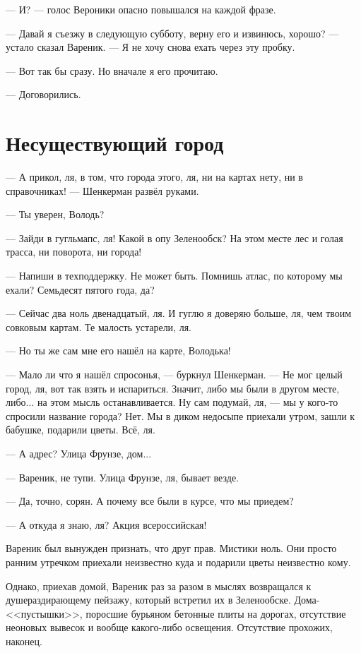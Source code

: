 \documentclass[a4paper,10pt,fleqn]{book}\usepackage{polyglossia}\setdefaultlanguage{english}\setotherlanguage{russian}\defaultfontfeatures{Ligatures=TeX,Mapping=tex-text} \usepackage{xcolor}\definecolor{lightgray}{HTML}{bbbbbb}\color{lightgray}\newcommand{\ml}[3]{\textcolor{black}{#3}}
\begin{document}
--- И? --- голос Вероники опасно повышался на каждой фразе.

--- Давай я съезжу в следующую субботу, верну его и извинюсь, хорошо? --- устало сказал Вареник.
--- Я не хочу снова ехать через эту пробку.

--- Вот так бы сразу.
Но вначале я его прочитаю.

--- Договорились.

\section{Несуществующий город}

--- А прикол, ля, в том, что города этого, ля, ни на картах нету, ни в справочниках! --- Шенкерман развёл руками.

--- Ты уверен, Володь?

--- Зайди в гугльмапс, ля!
Какой в опу Зеленообск?
На этом месте лес и голая трасса, ни поворота, ни города!

--- Напиши в техподдержку.
Не может быть.
Помнишь атлас, по которому мы ехали?
Семьдесят пятого года, да?

--- Сейчас два ноль двенадцатый, ля.
И гуглю я доверяю больше, ля, чем твоим совковым картам.
Те малость устарели, ля.

--- Но ты же сам мне его нашёл на карте, Володька!

--- Мало ли что я нашёл спросонья, --- буркнул Шенкерман.
--- Не мог целый город, ля, вот так взять и испариться.
Значит, либо мы были в другом месте, либо... на этом мысль останавливается.
Ну сам подумай, ля, --- мы у кого-то спросили название города?
Нет.
Мы в диком недосыпе приехали утром, зашли к бабушке, подарили цветы.
Всё, ля.

--- А адрес?
Улица Фрунзе, дом...

--- Вареник, не тупи.
Улица Фрунзе, ля, бывает везде.

--- Да, точно, сорян.
А почему все были в курсе, что мы приедем?

--- А откуда я знаю, ля?
Акция всероссийская!

Вареник был вынужден признать, что друг прав.
Мистики ноль.
Они просто ранним утречком приехали неизвестно куда и подарили цветы неизвестно кому.

Однако, приехав домой, Вареник раз за разом в мыслях возвращался к душераздирающему пейзажу, который встретил их в Зеленообске.
Дома-<<пустышки>>, поросшие бурьяном бетонные плиты на дорогах, отсутствие неоновых вывесок и вообще какого-либо освещения.
Отсутствие прохожих, наконец.
\end{document}
